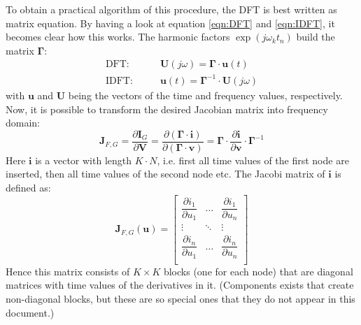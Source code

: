 To obtain a practical algorithm of this procedure, the DFT is best written
as matrix equation. By having a look at equation \ref{eqn:DFT} and
\ref{eqn:IDFT}, it becomes clear how this works. The harmonic factors
$\exp(j\omega_k t_n)$ build the matrix $\boldsymbol{\Gamma}$:
\begin{align}
\text{DFT:}  \qquad & \boldsymbol{U}(j\omega) = \boldsymbol{\Gamma}\cdot \boldsymbol{u}(t) \\
\text{IDFT:} \qquad & \boldsymbol{u}(t) = \boldsymbol{\Gamma}^{-1}\cdot \boldsymbol{U}(j\omega)
\end{align}
with $\boldsymbol{u}$ and $\boldsymbol{U}$ being the vectors of the time
and frequency values, respectively. Now, it is possible to transform the
desired Jacobian matrix into frequency domain:
\begin{equation}
\label{eqn:HB_jacobi}
\boldsymbol{J}_{F,G}
  = \frac{\partial\boldsymbol{I}_G}{\partial\boldsymbol{V}}
  = \frac{\partial(\boldsymbol{\Gamma}\cdot\boldsymbol{i})}
         {\partial(\boldsymbol{\Gamma}\cdot\boldsymbol{v})}
  = \boldsymbol{\Gamma}\cdot\frac{\partial\boldsymbol{i}}{\partial\boldsymbol{v}}
    \cdot\boldsymbol{\Gamma}^{-1}
\end{equation}
Here $\boldsymbol{i}$ is a vector with length $K\cdot N$, i.e. first all
time values of the first node are inserted, then all time values of the
second node etc. The Jacobi matrix of $\boldsymbol{i}$ is defined as:
\begin{equation}
\boldsymbol{J}_{F,G}(\boldsymbol{u}) =
\begin{bmatrix}
\dfrac{\partial i_1}{\partial u_1} & \hdots & \dfrac{\partial i_1}{\partial u_n} \\
\vdots & \ddots & \vdots\\
\dfrac{\partial i_n}{\partial u_1} & \hdots & \dfrac{\partial i_n}{\partial u_n} \\
\end{bmatrix}
\end{equation}
Hence this matrix consists of
$K \times K$ blocks (one for each node) that are diagonal matrices with
time values of the derivatives in it. (Components exists that create
non-diagonal blocks, but these are so special ones that they do not appear
in this document.)

\addvspace{12pt}

